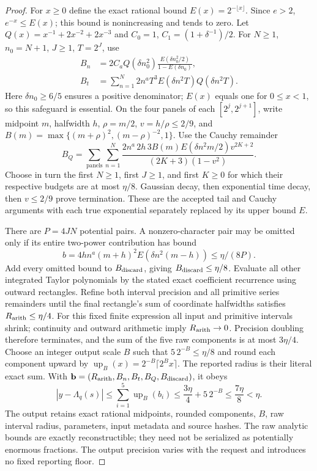 \documentclass[11pt]{article}
\theoremstyle{definition}\newtheorem{definition}[theorem]{Definition}
\theoremstyle{remark}\newtheorem{remark}[theorem]{Remark}
\begin{document}
\begin{proof}
For $x\ge0$ define the exact rational bound $E(x)=2^{-\lfloor x\rfloor}$.
Since $e>2$, $e^{-x}\le E(x)$; this bound is nonincreasing and tends to zero.
Let $Q(x)=x^{-1}+2x^{-2}+2x^{-3}$ and
$C_0=1$, $C_1=(1+\delta^{-1})/2$.
For $N\ge1$, $n_0=N+1$, $J\ge1$, $T=2^J$, use
\begin{align*}
 B_n&=2C_aQ(\delta n_0^2)
       \frac{E(\delta n_0^2/2)}{1-E(\delta n_0)},\\
 B_t&=\sum_{n=1}^N2n^aT^3E(\delta n^2T)Q(\delta n^2T).
\end{align*}
Here $\delta n_0\ge6/5$ ensures a positive denominator; $E(x)$ equals
one for $0\le x<1$, so this safeguard is essential.
On the four panels of each $[2^j,2^{j+1}]$, write midpoint $m$,
halfwidth $h$, $\rho=m/2$, $v=h/\rho\le2/9$,
and $B(m)=\max\{(m+\rho)^2,(m-\rho)^{-2},1\}$.
Use the Cauchy remainder
\[
 B_Q=\sum_{\mathrm{panels}}\sum_{n=1}^N
 \frac{2n^a\,2h\,3B(m)E(\delta n^2m/2)v^{2K+2}}
 {(2K+3)(1-v^2)}.
\]
Choose in turn the first $N\ge1$, first $J\ge1$, and first $K\ge0$
for which their respective budgets are at most $\eta/8$.
Gaussian decay, then exponential time decay, then $v\le2/9$ prove
termination. These are the accepted tail and Cauchy arguments with each
true exponential separately replaced by its upper bound $E$.

There are $P=4JN$ potential pairs. A nonzero-character pair may be
omitted only if its entire two-power contribution has bound
\[
 b=4hn^a(m+h)^2E(\delta n^2(m-h))\le\eta/(8P).
\]
Add every omitted bound to $B_{\rm discard}$, giving
$B_{\rm discard}\le\eta/8$.
Evaluate all other integrated Taylor polynomials by the stated exact
coefficient recurrence using outward rectangles. Refine both interval
precision and all primitive series remainders until the final rectangle's
sum of coordinate halfwidths satisfies $R_{\rm arith}\le\eta/4$.
For this fixed finite expression all input and primitive intervals shrink;
continuity and outward arithmetic imply $R_{\rm arith}\to0$.
Precision doubling therefore terminates, and the sum of the five raw
components is at most $3\eta/4$.
Choose an integer output scale $B$ such that $5\,2^{-B}\le\eta/8$ and
round each component upward by
$\operatorname{up}_B(x)=2^{-B}\lceil2^Bx\rceil$.
The reported radius is their literal exact sum. With
$\mathbf b=(R_{\rm arith},B_n,B_t,B_Q,B_{\rm discard})$, it obeys
\[
 |y-\Lambda_q(s)|\le\sum_{i=1}^5\operatorname{up}_B(b_i)
 \le\frac{3\eta}{4}+5\,2^{-B}\le\frac{7\eta}{8}<\eta.
\]
The output retains exact rational midpoints, rounded components, $B$,
raw interval radius, parameters, input metadata and source hashes.
The raw analytic bounds are exactly reconstructible; they need not be
serialized as potentially enormous fractions. The output precision varies
with the request and introduces no fixed reporting floor.
\end{proof}
\end{document}
